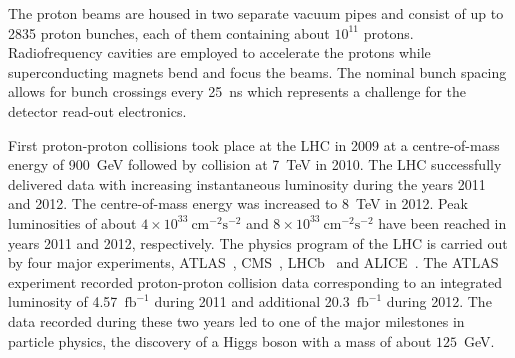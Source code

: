The proton beams are  housed in two separate vacuum pipes and consist of up to 2835 proton bunches, each
of them containing about $10^{11}$ protons. 
Radiofrequency cavities are employed  to accelerate the protons
while superconducting magnets bend and focus the beams.
The nominal bunch spacing allows for bunch crossings  every 25~ns which represents a challenge for the detector read-out electronics.

First proton-proton collisions took place at the LHC in 2009 at a centre-of-mass  energy of 900~GeV
followed by collision at 7~TeV in 2010. The LHC successfully delivered
 data with increasing instantaneous luminosity during the years 2011 and 2012. 
The  centre-of-mass  energy was increased to 8~TeV in 2012.
Peak luminosities of about $4\times10^{33} ~ \text{cm}^{-2}\text{s}^{-2}$ 
and $8\times10^{33} ~ \text{cm}^{-2}\text{s}^{-2}$  have been reached 
in years 2011 and 2012, respectively.
The physics program of the LHC is carried out  by four major experiments,  ATLAS~\cite{ATLASDetector}, CMS~\cite{cms},
LHCb~\cite{lhcb} and ALICE~\cite{alice}. 
The ATLAS experiment recorded proton-proton collision data corresponding to an integrated luminosity of 4.57~$\text{fb}^{-1}$ 
during 2011 and additional  20.3~$\text{fb}^{-1}$ during 2012.
The data recorded during  these two years  led to one of the major milestones
 in particle physics, the discovery of  a Higgs boson with a mass of about $125$~GeV.





